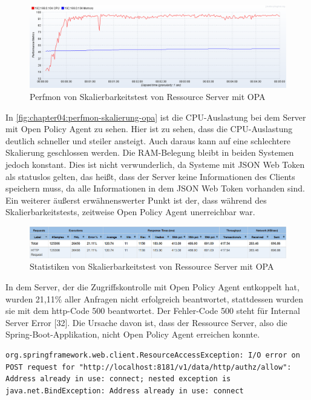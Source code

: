 \begin{figure}[htbp]
  \centering
  \includegraphics[width=1.0\textwidth]{gfx/perfmon-skalierung-opa.png}
  \caption{Perfmon von Skalierbarkeitstest von Ressource Server mit OPA}
  \label{fig:chapter04:perfmon-skalierung-opa}
\end{figure}

In \autoref{fig:chapter04:perfmon-skalierung-opa} ist die CPU-Auslastung bei dem Server mit Open Policy Agent zu sehen. Hier ist zu sehen, dass die CPU-Auslastung deutlich schneller und steiler ansteigt. Auch daraus kann auf eine schlechtere Skalierung geschlossen werden. 
Die RAM-Belegung bleibt in beiden Systemen jedoch konstant. Dies ist nicht verwunderlich, da Systeme mit JSON Web Token als statuslos gelten, das heißt, dass der Server keine Informationen des Clients speichern muss, da alle Informationen in dem JSON Web Token vorhanden sind. 
Ein weiterer äußerst erwähnenswerter Punkt ist der, dass während des Skalierbarkeitstests, zeitweise Open Policy Agent unerreichbar war. 

\begin{figure}[htbp]
  \centering
  \includegraphics[width=1.0\textwidth]{gfx/statistik-skalierung-opa.png}
  \caption{Statistiken von Skalierbarkeitstest von Ressource Server mit OPA}
  \label{fig:chapter04:statistik-skalierung-opa}
\end{figure}

In dem Server, der die Zugriffskontrolle mit Open Policy Agent entkoppelt hat, wurden 21,11\% aller Anfragen nicht erfolgreich beantwortet, stattdessen wurden sie mit dem http-Code 500 beantwortet. Der Fehler-Code 500 steht für Internal Server Error [32]. Die Ursache davon ist, dass der Ressource Server, also die Spring-Boot-Applikation, nicht Open Policy Agent erreichen konnte. 

\begin{lstlisting}[frame=tb,caption={Fehlermeldung Spring-Boot},label=lst:FehlermeldungSpring-Boot]
  org.springframework.web.client.ResourceAccessException: I/O error on POST request for "http://localhost:8181/v1/data/http/authz/allow": Address already in use: connect; nested exception is java.net.BindException: Address already in use: connect
\end{lstlisting}
\bigskip

